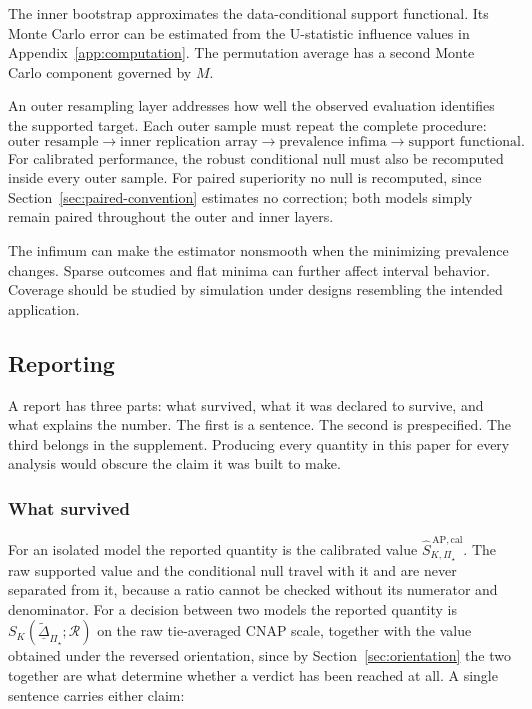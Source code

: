 \documentclass[11pt]{article}
\newcommand{\Regime}{\mathcal{R}}
\newcommand{\PSet}{\Pi_\star}
\newcommand{\SRobCalHat}{\widehat S_{K,\PSet}^{\,\mathrm{AP,cal}}}
\newcommand{\RobDta}{\underline{\widetilde{\Delta}}_{\PSet}}
\theoremstyle{remark}
\begin{document}
The inner bootstrap approximates the data-conditional support functional. Its Monte Carlo error can be estimated from the U-statistic influence values in Appendix~\ref{app:computation}. The permutation average has a second Monte Carlo component governed by $M$.

An outer resampling layer addresses how well the observed evaluation identifies the supported target. Each outer sample must repeat the complete procedure:
\[
\text{outer resample}
\longrightarrow
\text{inner replication array}
\longrightarrow
\text{prevalence infima}
\longrightarrow
\text{support functional}.
\]
For calibrated performance, the robust conditional null must also be recomputed inside every outer sample. For paired superiority no null is recomputed, since Section~\ref{sec:paired-convention} estimates no correction; both models simply remain paired throughout the outer and inner layers.

The infimum can make the estimator nonsmooth when the minimizing prevalence changes. Sparse outcomes and flat minima can further affect interval behavior. Coverage should be studied by simulation under designs resembling the intended application.

\subsection{Reporting}

A report has three parts: what survived, what it was declared to survive, and what explains the number. The first is a sentence. The second is prespecified. The third belongs in the supplement. Producing every quantity in this paper for every analysis would obscure the claim it was built to make.

\subsubsection*{What survived}

For an isolated model the reported quantity is the calibrated value $\SRobCalHat$. The raw supported value and the conditional null travel with it and are never separated from it, because a ratio cannot be checked without its numerator and denominator. For a decision between two models the reported quantity is $S_K(\RobDta;\Regime)$ on the raw tie-averaged CNAP scale, together with the value obtained under the reversed orientation, since by Section~\ref{sec:orientation} the two together are what determine whether a verdict has been reached at all. A single sentence carries either claim:
\end{document}
